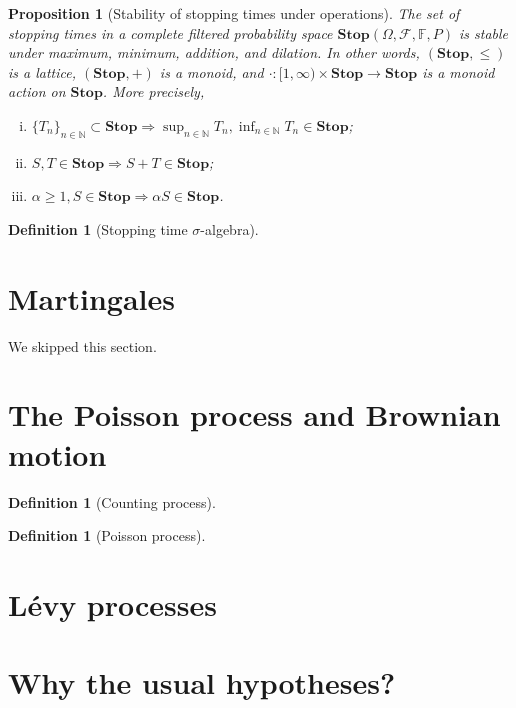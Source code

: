 \documentclass[openany,oneside]{book}
\newtheorem{prop}[thm]{Proposition}
\theoremstyle{definition}
\newtheorem{defn}[thm]{Definition}
\theoremstyle{remark}
\begin{document}
\begin{prop}[Stability of stopping times under operations]
The set of stopping times in a complete filtered probability space $\mathbf{Stop}(\Omega,\mathcal{F},\mathbb{F},P)$ is stable under maximum, minimum, addition, and dilation. In other words, $(\mathbf{Stop},\le)$ is a lattice, $(\mathbf{Stop},+)$ is a monoid, and $\cdot:[1,\infty)\times\mathbf{Stop} \to \mathbf{Stop}$ is a monoid action on $\mathbf{Stop}$. More precisely,
\begin{enumerate}[(i)]
\item $\{T_n\}_{n\in\mathbb{N}} \subset \mathbf{Stop} \Rightarrow \sup_{n\in\mathbb{N}} T_n, \inf_{n\in\mathbb{N}} T_n \in \mathbf{Stop}$;
\item $S,T\in \mathbf{Stop} \Rightarrow S+T \in \mathbf{Stop}$;
\item $\alpha \ge 1, S\in \mathbf{Stop} \Rightarrow \alpha S \in \mathbf{Stop}$.
\end{enumerate}
\end{prop}


\begin{defn}[Stopping time $\sigma$-algebra]

\end{defn}

\section{Martingales}
We skipped this section.


\section{The Poisson process and Brownian motion}

\begin{defn}[Counting process]

\end{defn}


\begin{defn}[Poisson process]

\end{defn}


\section{L\'evy processes}


\section{Why the usual hypotheses?}
\end{document}
